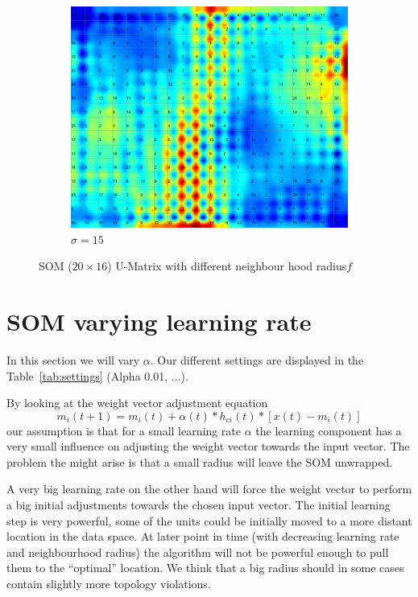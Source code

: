 \documentclass{acm_proc_article-sp}
\begin{document}
\begin{figure}
    \begin{subfigure}[b]{0.30\linewidth}
        \includegraphics[width=\linewidth]{img/wine-newmid-u-matrix-sigma-15}
        \caption{$\sigma=15$}
        \label{fig:wine-newmid-u-matrix-sigma-15}
    \end{subfigure}
    \caption{SOM ($20\times16$) U-Matrix with different neighbour hood radius$f$}
    \label{fig:wine-newmid-u-matrix-sigma}
\end{figure}

\section{SOM varying learning rate}

In this section we will vary $\alpha$.  Our different settings are displayed in the Table~\ref{tab:settings} (Alpha 0.01, ...).

By looking at the weight vector adjustment equation
\[
    m_i(t+1) = m_i(t) + \alpha(t) * h_{ci}(t) * [x(t) - m_i(t)]
\]
our assumption is that for a small learning rate $\alpha$ the learning component has a very small
influence on adjusting the weight vector towards the input vector.
The problem the might arise is that a small radius will leave the SOM unwrapped.

A very big learning rate on the other hand will force the weight vector to perform a big initial adjustments towards the chosen input vector.
The initial learning step is very powerful, some of the units could be initially moved to
a more distant location in the data space. At later point in time (with decreasing learning rate and neighbourhood radius) the algorithm
will not be powerful enough to pull them to the ``optimal'' location. We think that a big radius should in some cases contain slightly more topology violations.
\end{document}
